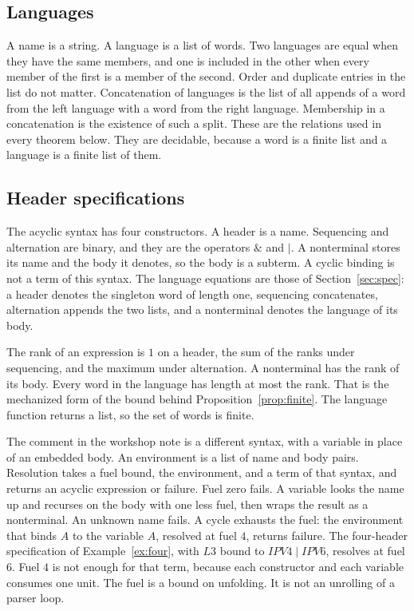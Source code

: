 \documentclass[a4paper,UKenglish,cleveref,autoref]{lipics-v2021}
\begin{document}
\subsection{Languages}

A name is a string.
A language is a list of words.
Two languages are equal when they have the same members, and one is included in the other when every member of the first is a member of the second.
Order and duplicate entries in the list do not matter.
Concatenation of languages is the list of all appends of a word from the left language with a word from the right language.
Membership in a concatenation is the existence of such a split.
These are the relations used in every theorem below.
They are decidable, because a word is a finite list and a language is a finite list of them.

\subsection{Header specifications}

The acyclic syntax has four constructors.
A header is a name.
Sequencing and alternation are binary, and they are the operators \(\&\) and \(\mid\).
A nonterminal stores its name and the body it denotes, so the body is a subterm.
A cyclic binding is not a term of this syntax.
The language equations are those of Section~\ref{sec:spec}: a header denotes the singleton word of length one, sequencing concatenates, alternation appends the two lists, and a nonterminal denotes the language of its body.

The rank of an expression is \(1\) on a header, the sum of the ranks under sequencing, and the maximum under alternation.
A nonterminal has the rank of its body.
Every word in the language has length at most the rank.
That is the mechanized form of the bound behind Proposition~\ref{prop:finite}.
The language function returns a list, so the set of words is finite.

The comment in the workshop note is a different syntax, with a variable in place of an embedded body.
An environment is a list of name and body pairs.
Resolution takes a fuel bound, the environment, and a term of that syntax, and returns an acyclic expression or failure.
Fuel zero fails.
A variable looks the name up and recurses on the body with one less fuel, then wraps the result as a nonterminal.
An unknown name fails.
A cycle exhausts the fuel: the environment that binds \(A\) to the variable \(A\), resolved at fuel \(4\), returns failure.
The four-header specification of Example~\ref{ex:four}, with \(\mathit{L3}\) bound to \(\mathit{IPV4} \mid \mathit{IPV6}\), resolves at fuel \(6\).
Fuel \(4\) is not enough for that term, because each constructor and each variable consumes one unit.
The fuel is a bound on unfolding.
It is not an unrolling of a parser loop.
\end{document}
